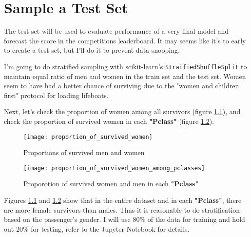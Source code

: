 \chapter{Sample a Test Set} \label{chapter:sample_test_set}
The test set will be used to evaluate performance of a very final model
and forecast the score in the competitions leaderboard. It may seems like
it's to early to create a test set, but I'll do it to prevent data snooping.

I'm going to do stratified sampling with scikit-learn's \texttt{StraifiedShuffleSplit}
to maintain equal ratio of men and women in the train set and the test set.
Women seem to have had a better chance of surviving due to the "women and
children first" protocol for loading lifeboats.

Next, let's check the proportion of women among all survivors (figure
\ref{proportion_of_survived_women}), and check the proportion of survived
women in each \textbf{"Pclass"} (figure 
\ref{proportion_of_survived_women_among_pclasses}).

\begin{figure}[!ht]
	\centering
	\texttt{[image: proportion\_of\_survived\_women]}
	\caption{Proportions of survived men and women}
	\label{proportion_of_survived_women}
\end{figure}

\begin{figure}[!ht]
	\centering
	\texttt{[image: proportion\_of\_survived\_women\_among\_pclasses]}
	\caption{Proporotion of survived women and men in each \textbf{"Pclass"}}
	\label{proportion_of_survived_women_among_pclasses}
\end{figure}

Figures \ref{proportion_of_survived_women} and 
\ref{proportion_of_survived_women_among_pclasses} show that in the entire 
dataset and in each \textbf{"Pclass"}, there are more female survivors 
than males. Thus it is reasonable to do stratification based on the
passenger's gender. I will use 80\% of the data for training and hold 
out 20\% for testing, refer to the Jupyter Notebook for details.